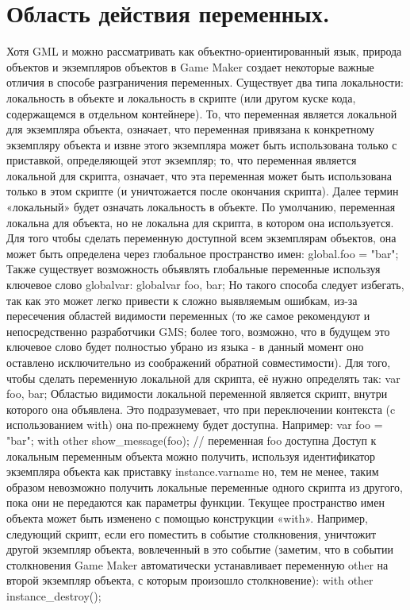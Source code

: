\documentclass[14pt,article]{scrartcl}
\begin{document}
\section{Область действия переменных.}
Хотя GML и можно рассматривать как объектно-ориентированный язык, природа объектов и экземпляров объектов в Game Maker создает некоторые важные отличия в способе разграничения переменных. Существует два типа локальности: локальность в объекте и локальность в скрипте (или другом куске кода, содержащемся в отдельном контейнере). То, что переменная является локальной для экземпляра объекта, означает, что переменная привязана к конкретному экземпляру объекта и извне этого экземпляра может быть использована только с приставкой, определяющей этот экземпляр; то, что переменная является локальной для скрипта, означает, что эта переменная может быть использована только в этом скрипте (и уничтожается после окончания скрипта). Далее термин «локальный» будет означать локальность в объекте. По умолчанию, переменная локальна для объекта, но не локальна для скрипта, в котором она используется. Для того чтобы сделать переменную доступной всем экземплярам объектов, она может быть определена через глобальное пространство имен:
global.foo = "bar";
Также существует возможность объявлять глобальные переменные используя ключевое слово globalvar:
globalvar foo, bar;
Но такого способа следует избегать, так как это может легко привести к сложно выявляемым ошибкам, из-за пересечения областей видимости переменных (то же самое рекомендуют и непосредственно разработчики GMS; более того, возможно, что в будущем это ключевое слово будет полностью убрано из языка - в данный момент оно оставлено исключительно из соображений обратной совместимости). Для того, чтобы сделать переменную локальной для скрипта, её нужно определять так:
var foo, bar;
Областью видимости локальной переменной является скрипт, внутри которого она объявлена. Это подразумевает, что при переключении контекста (c использованием with) она по-прежнему будет доступна. Например:
var foo = "bar";
with other
{
    show\_message(foo); // переменная foo доступна
}
Доступ к локальным переменным объекта можно получить, используя идентификатор экземпляра объекта как приставку
instance.varname
но, тем не менее, таким образом невозможно получить локальные переменные одного скрипта из другого, пока они не передаются как параметры функции. Текущее пространство имен объекта может быть изменено с помощью конструкции «with». Например, следующий скрипт, если его поместить в событие столкновения, уничтожит другой экземпляр объекта, вовлеченный в это событие (заметим, что в событии столкновения Game Maker автоматически устанавливает переменную other на второй экземпляр объекта, с которым произошло столкновение):
with other
{
    instance\_destroy();
}
\end{document}

